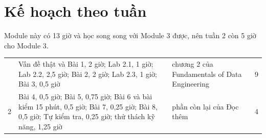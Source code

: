 \section{Kế hoạch theo tuần}

Module này có 13 giờ và học song song với Module 3 được, nên tuần 2 còn 5 giờ cho Module 3.

\begin{xltabular}{\textwidth}{@{}P{1.4cm} L P{3.6cm} P{1.2cm}@{}}
\toprule
{} &  &  &  \\
\midrule
\endhead
\bottomrule
{} & Vấn đề thật và Bài 1, 2 giờ; Lab 2.1, 1 giờ; Lab 2.2, 2,5 giờ; Bài 2, 2 giờ; Lab 2.3, 1 giờ; Bài 3, 0,5 giờ & chương 2 của Fundamentals of Data Engineering & 9 \\
2 & Bài 4, 0,5 giờ; Bài 5, 0,75 giờ; Bài 6 và bài kiểm 15 phút, 0,5 giờ; Bài 7, 0,25 giờ; Bài 8, 0,5 giờ; Tự kiểm tra, 0,25 giờ; thử thách kỹ năng, 1,25 giờ & phần còn lại của Đọc thêm & 4 \\
\end{xltabular}
